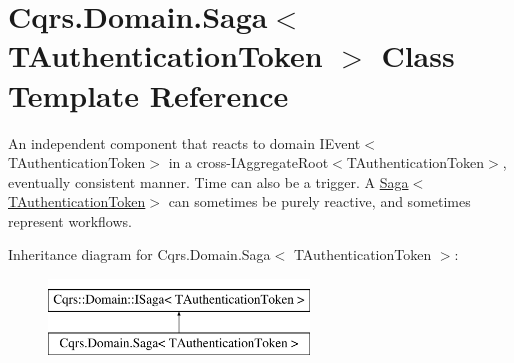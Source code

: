\hypertarget{classCqrs_1_1Domain_1_1Saga}{}\section{Cqrs.\+Domain.\+Saga$<$ T\+Authentication\+Token $>$ Class Template Reference}
\label{classCqrs_1_1Domain_1_1Saga}


An independent component that reacts to domain I\+Event$<$\+T\+Authentication\+Token$>$ in a cross-\/I\+Aggregate\+Root$<$\+T\+Authentication\+Token$>$, eventually consistent manner. Time can also be a trigger. A \hyperlink{classCqrs_1_1Domain_1_1Saga_a1b6019cecbbf2572b64dd456cb5d91a2_a1b6019cecbbf2572b64dd456cb5d91a2}{Saga$<$\+T\+Authentication\+Token$>$} can sometimes be purely reactive, and sometimes represent workflows.  


Inheritance diagram for Cqrs.\+Domain.\+Saga$<$ T\+Authentication\+Token $>$\+:\begin{figure}[H]
\begin{center}
\leavevmode
\includegraphics[height=2.000000cm]{classCqrs_1_1Domain_1_1Saga}
\end{center}
\end{figure}
